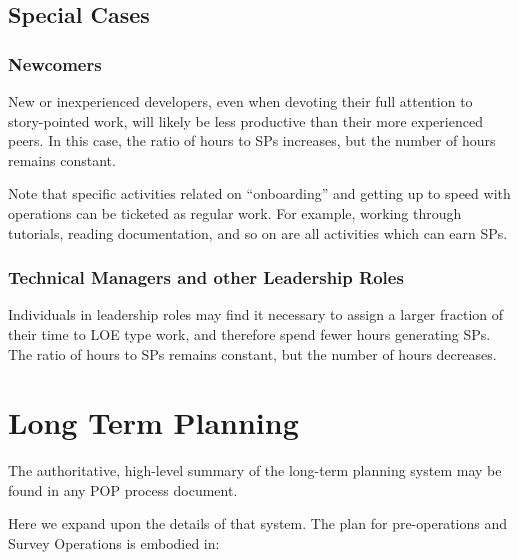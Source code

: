 \subsection{Special Cases}

\subsubsection{Newcomers}
\label{sec:newcomers}

New or inexperienced developers, even when devoting their full attention to \gls{story}-pointed work, will likely be less productive than their more experienced peers.
In this case, the ratio of hours to \glspl{SP} increases, but the number of hours remains constant.

Note that specific activities related on ``onboarding'' and getting up to speed with operations can be ticketed as regular work.
For example, working through tutorials, reading documentation, and so on are all activities which can earn \glspl{SP}.

\subsubsection{Technical Managers and other Leadership Roles}

Individuals in leadership roles may find it necessary to assign a larger fraction of their time to \gls{LOE} type work, and therefore spend fewer hours generating \glspl{SP}.
The ratio of hours to \glspl{SP} remains constant, but the number of hours decreases.

\section{Long Term Planning}
\label{sec:long-term-plan}

The authoritative, high-level summary of the long-term planning system may be found in any POP process document.

Here we expand upon the details of that system.
The plan for pre-operations and Survey Operations is embodied in:

